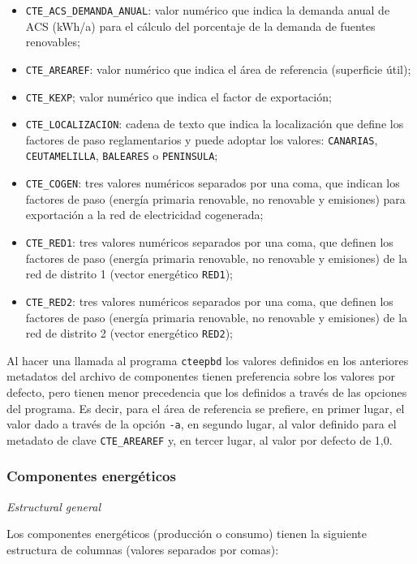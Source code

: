 \documentclass[10pt,notitlepage,oneside,a4paper]{article}
\begin{document}
\begin{itemize}
\item \texttt{CTE\_ACS\_DEMANDA\_ANUAL}: valor numérico que indica la demanda anual de ACS (kWh/a) para el cálculo del porcentaje de la demanda de fuentes renovables;
\item \texttt{CTE\_AREAREF}: valor numérico que indica el área de referencia (superficie útil);
\item \texttt{CTE\_KEXP}; valor numérico que indica el factor de exportación;
\item \texttt{CTE\_LOCALIZACION}: cadena de texto que indica la localización que define los factores de paso reglamentarios y puede adoptar los valores: \texttt{CANARIAS}, \texttt{CEUTAMELILLA}, \texttt{BALEARES} o \texttt{PENINSULA};
\item \texttt{CTE\_COGEN}: tres valores numéricos separados por una coma, que indican los factores de paso (energía primaria renovable, no renovable y emisiones) para exportación a la red de electricidad cogenerada;
\item \texttt{CTE\_RED1}: tres valores numéricos separados por una coma, que definen los factores de paso (energía primaria renovable, no renovable y emisiones) de la red de distrito 1 (vector energético \texttt{RED1});
\item \texttt{CTE\_RED2}: tres valores numéricos separados por una coma, que definen los factores de paso (energía primaria renovable, no renovable y emisiones) de la red de distrito 2 (vector energético \texttt{RED2});
\end{itemize}

Al hacer una llamada al programa \texttt{cteepbd} los valores definidos en los anteriores metadatos del archivo de componentes tienen preferencia sobre los valores por defecto, pero tienen menor precedencia que los definidos a través de las opciones del programa. Es decir, para el área de referencia se prefiere, en primer lugar, el valor dado a través de la opción \texttt{-a}, en segundo lugar, al valor definido para el metadato de clave \texttt{CTE\_AREAREF} y, en tercer lugar, al valor por defecto de 1,0.

\subsubsection{Componentes energéticos}\label{sec:componentesenergeticos}

\textit{Estructural general}

Los componentes energéticos (producción o consumo) tienen la siguiente estructura de columnas (valores separados por comas):
\end{document}
